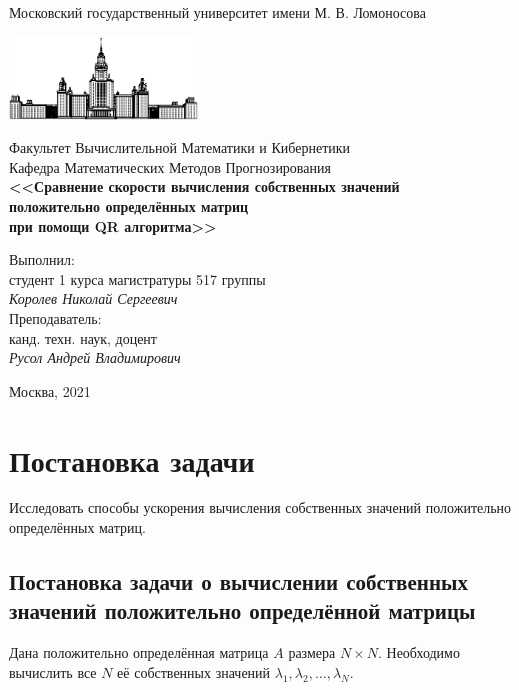 \documentclass[12pt, fleqn]{article}
\begin{document}
\begin{titlepage}
\begin{center}
    Московский государственный университет имени М. В. Ломоносова

    \bigskip
    \includegraphics[width=50mm]{msu.eps}

    \bigskip
    Факультет Вычислительной Математики и Кибернетики\\
    Кафедра Математических Методов Прогнозирования\\[10mm]

    \textsf{\large\bfseries
        <<Сравнение скорости вычисления собственных значений\\ положительно определённых матриц\\ при помощи QR алгоритма>>
    }\\[20mm]

    \begin{flushright}
        \parbox{0.5\textwidth}{
            Выполнил:\\
            студент 1 курса магистратуры 517 группы\\
            \emph{Королев Николай Сергеевич}\\[5mm]
            Преподаватель:\\
            канд. техн. наук, доцент\\
            \emph{Русол Андрей Владимирович}
        }
    \end{flushright}

    \vspace{\fill}
    Москва, 2021
\end{center}
\end{titlepage}

\newpage
\section{Постановка задачи}

Исследовать способы ускорения вычисления собственных значений положительно определённых матриц.

\subsection{Постановка задачи о вычислении собственных значений положительно определённой матрицы}
Дана положительно определённая матрица $A$ размера $N \times N$. Необходимо вычислить все $N$ её собственных значений $\lambda_1, \lambda_2, \dots, \lambda_N$.
\end{document}
